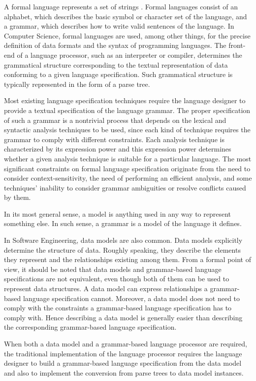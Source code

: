 \documentclass[preprint]{elsarticle}
\begin{document}
A formal language represents a set of strings \cite{Jurafsky2009}.
Formal languages consist of an alphabet, which describes the basic symbol or character set of the language, and a grammar, which describes how to write valid sentences of the language.
In Computer Science, formal languages are used, among other things, for the precise definition of data formats and the syntax of programming languages.
The front-end of a language processor, such as an interpreter or compiler, determines the grammatical structure corresponding to the textual representation of data conforming to a given language specification.
Such grammatical structure is typically represented in the form of a parse tree.

Most existing language specification techniques \cite{Aho1972} require the language designer to provide a textual specification of the language grammar.
The proper specification of such a grammar is a nontrivial process that depends on the lexical and syntactic analysis techniques to be used, since each kind of technique requires the grammar to comply with different constraints.
Each analysis technique is characterized by its expression power and this expression power determines whether a given analysis technique is suitable for a particular language.
The most significant constraints on formal language specification originate from the need to consider context-sensitivity, the need of performing an efficient analysis, and some techniques' inability to consider grammar ambiguities or resolve conflicts caused by them.

In its most general sense, a model is anything used in any way to represent something else.
In such sense, a grammar is a model of the language it defines.

In Software Engineering, data models are also common.
Data models explicitly determine the structure of data.
Roughly speaking, they describe the elements they represent and the relationships existing among them.
From a formal point of view, it should be noted that data models and grammar-based language specifications are not equivalent, even though both of them can be used to represent data structures.
A data model can express relationships a grammar-based language specification cannot.
Moreover, a data model does not need to comply with the constraints a grammar-based language specification has to comply with.
Hence describing a data model is generally easier than describing the corresponding grammar-based language specification.

When both a data model and a grammar-based language processor are required, the traditional implementation of the language processor requires the language designer to build a grammar-based language specification from the data model and also to implement the conversion from parse trees to data model instances.
\end{document}
